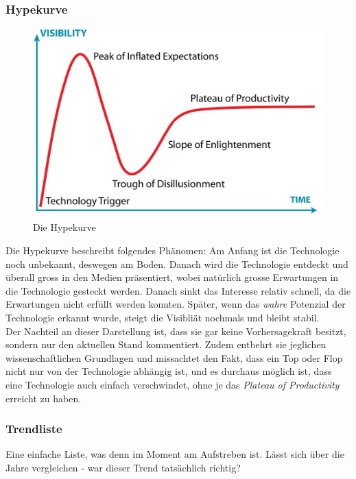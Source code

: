\subsubsection{Hypekurve}
\begin{figure}
\centering
\includegraphics[width=0.7\linewidth]{fig/hype_kurve}
\caption{Die Hypekurve}
\label{fig:hype_kurve}
\end{figure}
Die Hypekurve beschreibt folgendes Phänomen: Am Anfang ist die Technologie noch unbekannt, deswegen am Boden. Danach wird die Technologie entdeckt und überall gross in den Medien präsentiert, wobei natürlich grosse Erwartungen in die Technologie gesteckt werden. Danach sinkt das Interesse relativ schnell, da die Erwartungen nicht erfüllt werden konnten. Später, wenn das \textit{wahre} Potenzial der Technologie erkannt wurde, steigt die Visibliät nochmals und bleibt stabil. \\
Der Nachteil an dieser Darstellung ist, dass sie gar keine Vorhersagekraft besitzt, sondern nur den aktuellen Stand kommentiert. Zudem entbehrt sie jeglichen wissenschaftlichen Grundlagen und missachtet den Fakt, dass ein Top oder Flop nicht nur von der Technologie abhängig ist, und es durchaus möglich ist, dass eine Technologie auch einfach verschwindet, ohne je das \textit{Plateau of Productivity} erreicht zu haben.
\subsubsection{Trendliste}
Eine einfache Liste, was denn im Moment am Aufstreben ist. Lässt sich über die Jahre vergleichen - war dieser Trend tatsächlich richtig?
